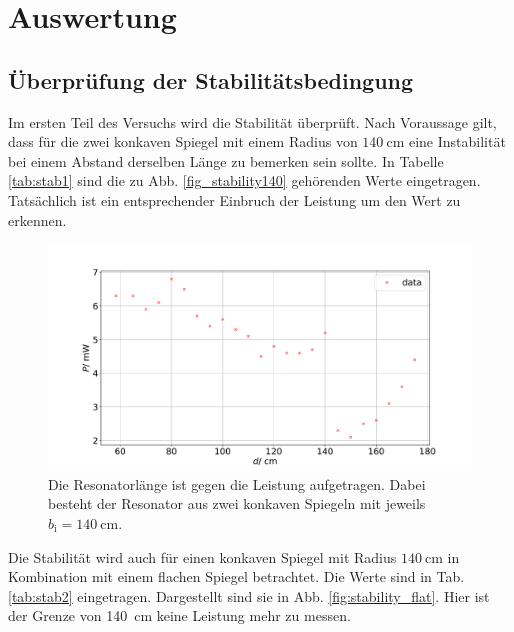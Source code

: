 \section{Auswertung}
\label{sec:Auswertung}

\subsection{Überprüfung der Stabilitätsbedingung}

Im ersten Teil des Versuchs wird die Stabilität überprüft. Nach Voraussage gilt, dass für die zwei konkaven Spiegel mit einem Radius von $\SI{140}{\centi\meter}$ eine Instabilität bei einem Abstand derselben Länge zu bemerken sein sollte. 
In Tabelle \ref{tab:stab1} sind die zu Abb. \ref{fig_stability140} gehörenden Werte eingetragen.
Tatsächlich ist ein entsprechender Einbruch der Leistung um den Wert zu erkennen. 



\begin{figure}
    \centering
    \includegraphics[width=\textwidth]{plots/stability140.pdf}
    \caption{Die Resonatorlänge ist gegen die Leistung aufgetragen. Dabei besteht der Resonator aus zwei konkaven Spiegeln mit jeweils $b_\text{i} = \SI{140}{\centi\meter}$.}
    \label{fig:stability140}
\end{figure} 

Die Stabilität wird auch für einen konkaven Spiegel mit Radius $\SI{140}{\centi\meter}$ in Kombination mit einem flachen Spiegel betrachtet. Die Werte sind in Tab. \ref{tab:stab2} eingetragen. Dargestellt sind sie in Abb. \ref{fig:stability_flat}.
Hier ist der Grenze von \SI{140}{\centi\meter} keine Leistung mehr zu messen.



